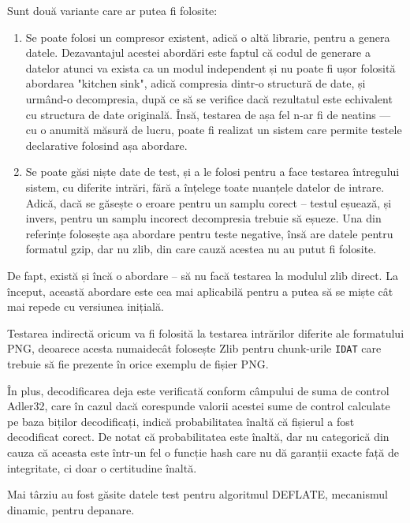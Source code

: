 \documentclass[a4paper,12pt]{report}
\begin{document}
Sunt două variante care ar putea fi folosite:
\begin{enumerate}
    \item
        Se poate folosi un compresor existent, adică o altă librarie, pentru a genera datele.
        Dezavantajul acestei abordări este faptul că codul de generare a datelor atunci va exista
        ca un modul independent și nu poate fi ușor folosită abordarea "kitchen sink", adică
        compresia dintr-o structură de date, și urmând-o decompresia, după ce să se verifice
        dacă rezultatul este echivalent cu structura de date originală.
        Însă, testarea de așa fel n-ar fi de neatins --- cu o anumită măsură de lucru,
        poate fi realizat un sistem care permite testele declarative folosind așa abordare.
    \item
        Se poate găsi niște date de test, și a le folosi pentru a face testarea
        întregului sistem, cu diferite intrări, fără a înțelege toate nuanțele datelor de intrare.
        Adică, dacă se găsește o eroare pentru un samplu corect -- testul eșuează,
        și invers, pentru un samplu incorect decompresia trebuie să eșueze.
        Una din referințe \cite{gzip_impl} folosește așa abordare pentru teste negative,
        însă are datele pentru formatul gzip, dar nu zlib, din care cauză acestea nu au putut fi folosite.
\end{enumerate}

De fapt, există și încă o abordare -- să nu facă testarea la modulul zlib direct.
La început, această abordare este cea mai aplicabilă pentru a putea să se miște cât mai repede cu versiunea inițială.

Testarea indirectă oricum va fi folosită la testarea intrărilor diferite ale formatului \ac{PNG},
deoarece acesta numaidecât folosește Zlib pentru chunk-urile \texttt{IDAT} care trebuie să fie prezente
în orice exemplu de fișier \ac{PNG}.

În plus, decodificarea deja este verificată conform câmpului de suma de control Adler32,
care în cazul dacă corespunde valorii acestei sume de control calculate pe baza biților decodificați,
indică probabilitatea înaltă că fișierul a fost decodificat corect. 
De notat că probabilitatea este înaltă, dar nu categorică din cauza
că aceasta este într-un fel o funcție hash care nu dă garanții
exacte față de integritate, ci doar o certitudine înaltă.

Mai târziu au fost găsite datele test pentru algoritmul DEFLATE,
mecanismul dinamic, pentru depanare\cite{deflate_tests}.
\end{document}

